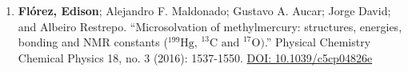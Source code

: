 \begin{enumerate}[leftmargin=7mm]
    \item \textbf{Flórez, Edison}; Alejandro F. Maldonado; Gustavo A. Aucar; Jorge David; and Albeiro Restrepo. ``Microsolvation of methylmercury: structures, energies, bonding and NMR constants ($^{199}\text{Hg, }^{13}\text{C and }^{17}\text{O)}$.'' Physical Chemistry Chemical Physics 18, no. 3 (2016): 1537-1550.
          \href{https://www.doi.org/10.1039/c5cp04826e}{DOI: 10.1039/c5cp04826e}

\end{enumerate}


